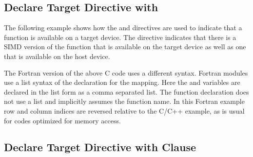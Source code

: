 
\subsection{Declare Target Directive with }
\label{subsec:declare_target_simd}




The following example shows how the  and 
 directives are used to indicate that a function 
is available on a target device. The  directive indicates 
that there is a SIMD version of the function  that is available on the target 
device as well as one that is available on the host device.


The Fortran version of the above C code uses a different syntax. Fortran modules 
use a list syntax of the  declaration for the mapping. 
Here the  and  variables are declared in the list form as a comma separated list. 
The function declaration does not use a list and implicitly assumes the function 
name. In this Fortran example row and column indices are reversed relative to the 
C/C++ example, as is usual for codes optimized for memory access.



\subsection{Declare Target Directive with  Clause}
\label{subsec:declare_target_link}



